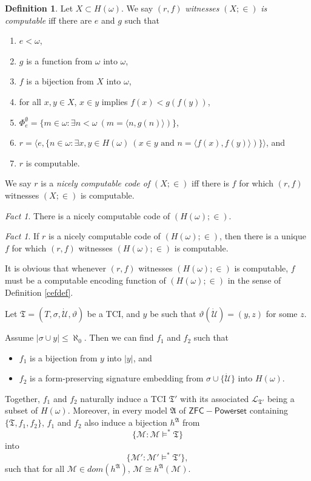 \documentclass[12pt, twoside]{memoir}
\numberwithin{equation}{section}
\theoremstyle{definition}
\newtheorem{defi}[thm]{Definition}
\theoremstyle{remark}
\newtheorem{fact}[thm]{Fact}
\theoremstyle{definition}
\theoremstyle{definition}
\theoremstyle{definition}
\theoremstyle{remark}
\begin{document}
\begin{defi}
Let $X \subset H(\omega)$. We say $(r, f)$ \emph{witnesses} $(X; \in)$ \emph{is computable} iff there are $e$ and $g$ such that
\begin{enumerate}[label=(\alph*)]
    \item $e < \omega$,
    \item $g$ is a function from $\omega$ into $\omega$,
    \item $f$ is a bijection from $X$ into $\omega$,
    \item for all $x, y \in X$, $x \in y$ implies $f(x) < g(f(y))$,
    \item $\Phi^{\emptyset}_e = \{m \in \omega : \exists n < \omega \ (m = \langle n, g(n) \rangle)\}$,
    \item $r = \langle e, \{n \in \omega : \exists x, y \in H(\omega) \ (x \in y \text{ and } n = \langle f(x), f(y) \rangle)\} \rangle$, and
    \item $r$ is computable.
\end{enumerate}
We say $r$ is a \emph{nicely computable code of} $(X; \in)$ iff there is $f$ for which $(r, f)$ witnesses $(X; \in)$ is computable.
\end{defi}

\begin{fact}
There is a nicely computable code of $(H(\omega); \in)$. 
\end{fact}

\begin{fact}\label{uniquecode}
If $r$ is a nicely computable code of $(H(\omega); \in)$, then there is a unique $f$ for which $(r, f)$ witnesses $(H(\omega); \in)$ is computable.
\end{fact}

It is obvious that whenever $(r, f)$ witnesses $(H(\omega); \in)$ is computable, $f$ must be a computable encoding function of $(H(\omega); \in)$ in the sense of Definition \ref{cefdef}.

Let $\mathfrak{T} = (T, \sigma, \dot{\mathcal{U}}, \vartheta)$ be a TCI, and $y$ be such that $\vartheta(\dot{\mathcal{U}}) = (y, z)$ for some $z$.

Assume $|\sigma \cup y| \leq \aleph_0$. Then we can find $f_1$ and $f_2$ such that
\begin{itemize}
    \item $f_1$ is a bijection from $y$ into $|y|$, and
    \item $f_2$ is a form-preserving signature embedding from $\sigma \cup \{\dot{\mathcal{U}}\}$ into $H(\omega)$.
\end{itemize}
Together, $f_1$ and $f_2$ naturally induce a TCI $\mathfrak{T}'$ with its associated $\mathcal{L}_{\mathfrak{T}'}$ being a subset of $H(\omega)$. Moreover, in every model $\mathfrak{A}$ of $\mathsf{ZFC - Powerset}$ containing $\{\mathfrak{T}, f_1, f_2\}$, $f_1$ and $f_2$ also induce a bijection $h^{\mathfrak{A}}$ from $$\{\mathcal{M} : \mathcal{M} \models^* \mathfrak{T}\}$$ into $$\{\mathcal{M}' : \mathcal{M}' \models^* \mathfrak{T}'\},$$ such that for all $\mathcal{M} \in dom(h^{\mathfrak{A}})$, $\mathcal{M} \cong h^{\mathfrak{A}}(\mathcal{M})$. 
\end{document}
